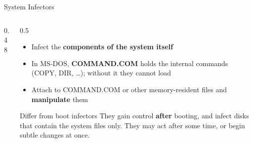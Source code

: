 \documentclass[aspectratio=169,11pt,xcolor={table}]{beamer}
\begin{document}
\begin{frame}{System Infectors}
  \begin{columns}[c]
    \begin{column}{0.48\textwidth}
      \centering
    \end{column}
    \begin{column}{0.5\textwidth}
      \begin{itemize}\small\setlength{\itemsep}{3pt}
        \item Infect the \textbf{components of the system itself}
        \item In MS-DOS, \textbf{COMMAND.COM} holds the internal commands (COPY, DIR, \dots); without it they cannot load
        \item Attach to COMMAND.COM or other memory-resident files and \textbf{manipulate} them
      \end{itemize}
      \begin{block}{Differ from boot infectors}
        \small They gain control \textbf{after} booting, and infect disks that contain the system files only. They may act after some time, or begin subtle changes at once.
      \end{block}
    \end{column}
  \end{columns}
\end{frame}
\end{document}
